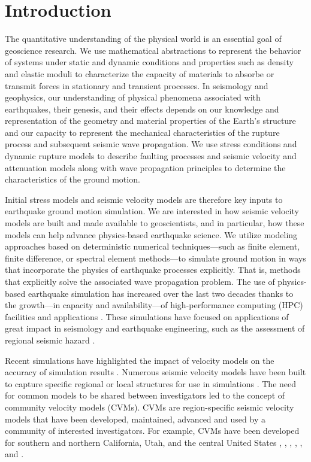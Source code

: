 
\section{Introduction}
\label{sec:introduction}

The quantitative understanding of the physical world is an essential goal of geoscience research. We use mathematical abstractions to represent the behavior of systems under static and dynamic conditions and properties such as density and elastic moduli to characterize the capacity of materials to absorbe or transmit forces in stationary and transient processes. In seismology and geophysics, our understanding of physical phenomena associated with earthquakes, their genesis, and their effects depends on our knowledge and representation of the geometry and material properties of the Earth's structure and our capacity to represent the mechanical characteristics of the rupture process and subsequent seismic wave propagation. We use stress conditions and dynamic rupture models to describe faulting processes and seismic velocity and attenuation models along with wave propagation principles to determine the characteristics of the ground motion.

Initial stress models and seismic velocity models are therefore key inputs to earthquake ground motion simulation. We are interested in how seismic velocity models are built and made available to geoscientists, and in particular, how these models can help advance physics-based earthquake science. We utilize modeling approaches based on deterministic numerical techniques---such as finite element, finite difference, or spectral element methods---to simulate ground motion in ways that incorporate the physics of earthquake processes explicitly. That is, methods that explicitly solve the associated wave propagation problem. The use of physics-based earthquake simulation has increased over the last two decades thanks to the growth---in capacity and availability---of high-performance computing (HPC) facilities and applications \citep[e.g.,][]{Aagaard_2008_BSSA2, Olsen_2009_GRL, Bielak_2010_GJI, Cui_2010_Proc}. These simulations have focused on applications of great impact in seismology and earthquake engineering, such as the assessment of regional seismic hazard \citep[e.g.,][]{Graves_2011_PAG}.

Recent simulations have highlighted the impact of velocity models on the accuracy of simulation results \citep[e.g.,][]{Taborda_2014_BSSA}. Numerous seismic velocity models have been built to capture specific regional or local structures for use in simulations \citep[e.g.,][]{Frankel_1992_BSSA, Brocher_2008_BSSA, Graves_2008_BSSA}. The need for common models to be shared between investigators led to the concept of community velocity models (CVMs). CVMs are region-specific seismic velocity models that have been developed, maintained, advanced and used by a community of interested investigators. For example, CVMs have been developed for southern and northern California, Utah, and the central United States \citet{Kohler_2003_BSSA}, \citet{Suss_2003_JGR}, \citet{Brocher_2006_Proc}, \citet{Magistrale_2006_Tech}, \citet{Plesch_2011_SCEC}, and \citet{RamirezGuzman_2012_BSSA}. 

